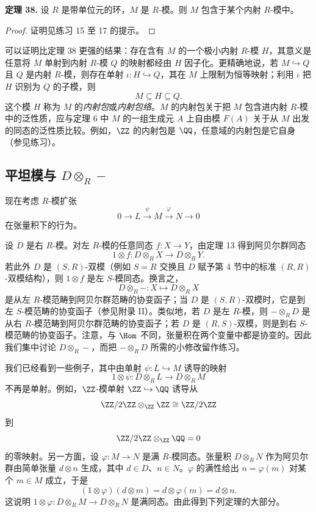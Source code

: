 \noindent\textbf{定理 38.} 设 $R$ 是带单位元的环，$M$ 是 $R$-模。则 $M$ 包含于某个内射 $R$-模中。

\begin{proof}
证明见练习 15 至 17 的提示。
\end{proof}

可以证明比定理 38 更强的结果：存在含有 $M$ 的一个极小内射 $R$-模 $H$，其意义是任意将 $M$ 单射到内射 $R$-模 $Q$ 的映射都经由 $H$ 因子化。更精确地说，若 $M\hookrightarrow Q$ 且 $Q$ 是内射 $R$-模，则存在单射 $\iota:H\hookrightarrow Q$，其在 $M$ 上限制为恒等映射；利用 $\iota$ 把 $H$ 识别为 $Q$ 的子模，则
\[
M\subseteq H\subseteq Q.
\]
这个模 $H$ 称为 $M$ 的\emph{内射包}或\emph{内射包络}。$M$ 的内射包关于把 $M$ 包含进内射 $R$-模中的泛性质，应与定理 6 中 $M$ 的一组生成元 $A$ 上自由模 $F(A)$ 关于从 $M$ 出发的同态的泛性质比较。例如，$\ZZ$ 的内射包是 $\QQ$，任意域的内射包是它自身（参见练习）。

\subsection*{平坦模与 $D\otimes_R-$}

现在考虑 $R$-模扩张
\[
0\longrightarrow L\xrightarrow{\psi}M\xrightarrow{\varphi}N\longrightarrow0
\]
在张量积下的行为。

设 $D$ 是右 $R$-模。对左 $R$-模的任意同态 $f:X\to Y$，由定理 13 得到阿贝尔群同态
\[
1\otimes f:D\otimes_R X\longrightarrow D\otimes_R Y.
\]
若此外 $D$ 是 $(S,R)$-双模（例如 $S=R$ 交换且 $D$ 赋予第 4 节中的标准 $(R,R)$-双模结构），则 $1\otimes f$ 是左 $S$-模同态。换言之，
\[
D\otimes_R-:X\longmapsto D\otimes_RX
\]
是从左 $R$-模范畴到阿贝尔群范畴的协变函子；当 $D$ 是 $(S,R)$-双模时，它是到左 $S$-模范畴的协变函子（参见附录 II）。类似地，若 $D$ 是左 $R$-模，则 $-\otimes_RD$ 是从右 $R$-模范畴到阿贝尔群范畴的协变函子；若 $D$ 是 $(R,S)$-双模，则是到右 $S$-模范畴的协变函子。注意，与 $\Hom$ 不同，张量积在两个变量中都是协变的。因此我们集中讨论 $D\otimes_R-$，而把 $-\otimes_RD$ 所需的小修改留作练习。

我们已经看到一些例子，其中由单射 $\psi:L\hookrightarrow M$ 诱导的映射
\[
1\otimes\psi:D\otimes_RL\longrightarrow D\otimes_RM
\]
不再是单射。例如，$\ZZ$-模单射 $\ZZ\hookrightarrow\QQ$ 诱导从
\[
\ZZ/2\ZZ\otimes_\ZZ\ZZ\cong\ZZ/2\ZZ
\]
到
\[
\ZZ/2\ZZ\otimes_\ZZ\QQ=0
\]
的零映射。另一方面，设 $\varphi:M\to N$ 是满 $R$-模同态。张量积 $D\otimes_RN$ 作为阿贝尔群由简单张量 $d\otimes n$ 生成，其中 $d\in D$、$n\in N$。$\varphi$ 的满性给出 $n=\varphi(m)$ 对某个 $m\in M$ 成立，于是
\[
(1\otimes\varphi)(d\otimes m)=d\otimes\varphi(m)=d\otimes n.
\]
这说明 $1\otimes\varphi:D\otimes_RM\to D\otimes_RN$ 是满同态。由此得到下列定理的大部分。

